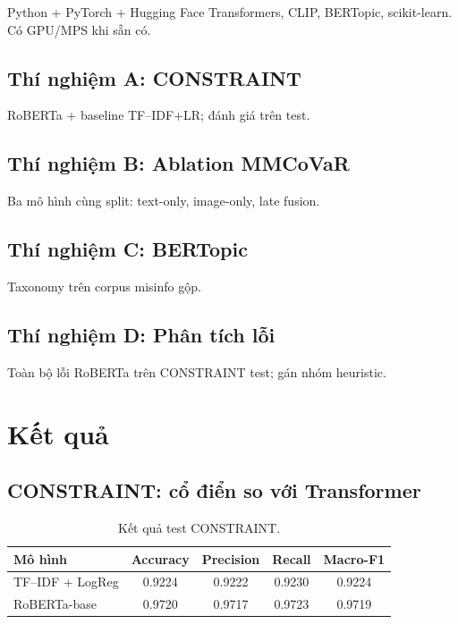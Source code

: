 \documentclass[12pt, a4paper]{report}
\begin{document}
Python + PyTorch + Hugging Face Transformers, CLIP, BERTopic, scikit-learn.
Có GPU/MPS khi sẵn có.

\subsection{Thí nghiệm A: CONSTRAINT}

RoBERTa + baseline TF--IDF+LR; đánh giá trên test.

\subsection{Thí nghiệm B: Ablation MMCoVaR}

Ba mô hình cùng split: text-only, image-only, late fusion.

\subsection{Thí nghiệm C: BERTopic}

Taxonomy trên corpus misinfo gộp.

\subsection{Thí nghiệm D: Phân tích lỗi}

Toàn bộ lỗi RoBERTa trên CONSTRAINT test; gán nhóm heuristic.

\section{Kết quả}
\label{sec:results}

\subsection{CONSTRAINT: cổ điển so với Transformer}

\begin{table}[htbp]
\centering
\caption{Kết quả test CONSTRAINT.}
\label{tab:constraint-results}
\begin{tabular}{lcccc}
\hline
Mô hình & Accuracy & Precision & Recall & Macro-F1 \\
\hline
TF--IDF + LogReg & 0.9224 & 0.9222 & 0.9230 & 0.9224 \\
RoBERTa-base & 0.9720 & 0.9717 & 0.9723 & 0.9719 \\
\hline
\end{tabular}
\end{table}
\end{document}
